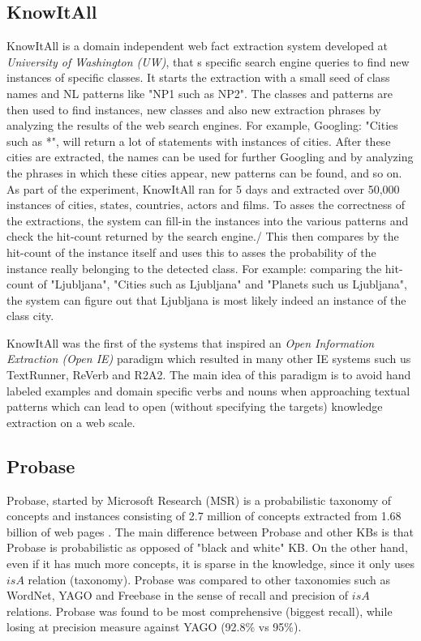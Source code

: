 \subsection{KnowItAll}
\label{section:r:knowitall}
KnowItAll\parencite{Etzioni2004} is a domain independent web fact extraction 
system developed at \emph{University of Washington (UW)}, that s specific search engine queries to find new instances of specific
classes. It starts the extraction with a small seed of class names and NL patterns
like "NP1 such as NP2". The classes and patterns are then used to find instances,
new classes and also new extraction phrases by analyzing the results of the 
web search engines. For example, Googling: "Cities such as *", will return 
a lot of statements with instances of cities. After these cities are extracted,
the names can be used for further Googling and by analyzing the phrases in which
these cities appear, new patterns can be found, and so on. As part of the
experiment, KnowItAll ran for 5 days and extracted over 50,000 instances of
cities, states, countries, actors and films.
To asses the correctness of the extractions, the system can fill-in the instances
into the various patterns and check the hit-count returned by the search engine./
This then compares by the hit-count of the instance itself and uses this to
asses the probability of the instance really belonging to the detected class.
For example: comparing the hit-count of "Ljubljana", "Cities such as Ljubljana"
and "Planets such us Ljubljana", the system can figure out that Ljubljana is
most likely indeed an instance of the class city.

KnowItAll was the first of the systems that inspired an \emph{Open Information
Extraction (Open IE)} paradigm\parencite{Etzioni2011} which resulted in many 
other IE systems such us TextRunner, ReVerb and R2A2. The main idea of this
paradigm is to avoid hand labeled examples and domain specific verbs and nouns
when approaching textual patterns which can lead to open (without specifying the
targets) knowledge extraction on a web scale.

\subsection{Probase}
\label{section:r:probase}
Probase, started by Microsoft Research (MSR) is a probabilistic taxonomy of 
concepts and instances consisting of
2.7 million of concepts extracted from 1.68 billion of web pages
\parencite{Wu2012}. The main difference between Probase and other KBs is that
Probase is probabilistic as opposed of "black and white" KB. On the other hand,
even if it has much more concepts, it is sparse in the knowledge, since it only
uses $isA$ relation (taxonomy). Probase was compared to other taxonomies such as
WordNet, YAGO and Freebase in the sense of recall and precision of $isA$ 
relations. Probase was found to be most comprehensive (biggest recall), while
losing at precision measure against YAGO (92.8\% vs 95\%). 

